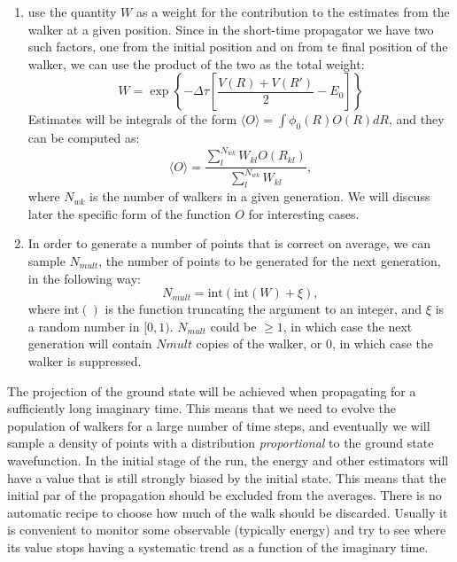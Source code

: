 \begin{enumerate}
	\item
	use the quantity $W$ as a weight for the contribution to the estimates from the walker at a given position. Since in the short-time propagator we have two such factors, one from the initial position and on from te final position of the walker, we can use the product of the two as the total weight:
	\begin{equation}
	W=\exp\left\{ -\Delta\tau\left[\frac{V(R)+V(R')}{2}-E_0\right]\right\}
	\end{equation}
	Estimates will be integrals of the form $\langle O\rangle=\int \phi_0(R) O(R) dR$,
	and they can be computed as:
	\begin{equation}
	   \langle O\rangle =\frac{  \sum_l^{N_{wk}}W_{kl}O(R_{kl})}
	   	{\sum_l^{N_{wk}}W_{kl}},\label{dmc_averages}
	\end{equation} 
where $N_{wk}$ is the number of walkers in a given generation. We will discuss later the specific form of the function $O$ for interesting cases.
\item
In order to generate a number of points that is correct on average, we can sample $N_{mult}$, the number of points to be generated for the next generation, in the following way:
\begin{equation}
N_{mult}=\text{int}(\text{int}(W)+\xi),
\end{equation}
where $\text{int}()$ is the function truncating the argument to an integer, and $\xi$ is a random number in $[0,1)$. $N_{mult}$ could be $\geq 1$, in which case the next generation will contain
$N{mult}$ copies of the walker, or $0$, in which case the walker is suppressed. 
\end{enumerate}	
The projection of the ground state will be achieved when propagating for a sufficiently long imaginary time. This means that we need to evolve the population of walkers for a large number of time steps, and eventually we will sample a density of points with a distribution {\it proportional} to the ground state wavefunction. In the initial stage of the run, the energy and other estimators will have a value that is still strongly biased by the initial state. This means that the initial par of the propagation should be excluded from the averages. There is no automatic recipe to choose how much of the walk should be discarded. Usually it is convenient to monitor some observable (typically energy) and try to see where its value stops having a systematic trend as a function of the imaginary time. 

